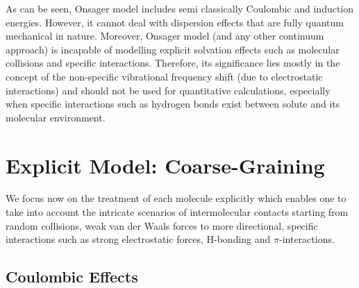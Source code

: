 \documentclass[a4paper,titlepage,twoside,fleqn,12pt]{book}
\begin{document}
\begin{refsection}
As can be seen, Onsager model includes semi classically
Coulombic and induction energies. However, it cannot
deal with dispersion effects that are fully quantum mechanical
in nature. Moreover,
Onsager model (and any other continuum approach) 
is incapable of modelling
explicit solvation effects such as molecular collisions
and specific interactions. Therefore, its significance
lies mostly in the concept of the non\hyp{}specific
vibrational frequency shift (due to electrostatic
interactions) and should not be used for quantitative
calculations, especially when specific interactions such as
hydrogen bonds exist between solute and its molecular environment.


\section{Explicit Model: Coarse-Graining\label{s:vibr-solv-explicit-models}}

We focus now on the treatment of each molecule
explicitly which enables one to take into account
the intricate scenarios of intermolecular contacts
starting from random collisions, weak van der Waals
forces to more directional, specific interactions
such as strong electrostatic forces, H-bonding and
$\pi$-interactions.

\subsection{Coulombic Effects\label{s:dw-coul}}


\end{refsection}
\end{document}
